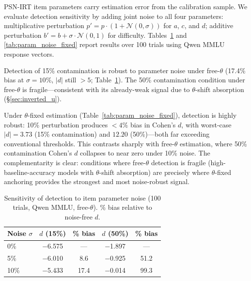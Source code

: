 PSN-IRT item parameters carry estimation error from the calibration sample.
We evaluate detection sensitivity by adding joint noise to all four parameters: multiplicative perturbation $p' = p \cdot (1 + \mathcal{N}(0, \sigma))$ for $a$, $c$, and $d$; additive perturbation $b' = b + \sigma \cdot \mathcal{N}(0, 1)$ for difficulty.
Tables~\ref{tab:param_noise_free} and \ref{tab:param_noise_fixed} report results over 100 trials using Qwen MMLU response vectors.

Detection of 15\% contamination is robust to parameter noise under free-$\theta$ (17.4\% bias at $\sigma{=}10\%$, $|d|$ still ${>}5$; Table~\ref{tab:param_noise_free}).
The 50\% contamination condition under free-$\theta$ is fragile---consistent with its already-weak signal due to $\theta$-shift absorption (\S\ref{sec:inverted_u}).

Under $\theta$-fixed estimation (Table~\ref{tab:param_noise_fixed}), detection is highly robust: 10\% perturbation produces ${<}4\%$ bias in Cohen's $d$, with worst-case $|d| = 3.73$ (15\% contamination) and $12.20$ (50\%)---both far exceeding conventional thresholds.
This contrasts sharply with free-$\theta$ estimation, where 50\% contamination Cohen's $d$ collapses to near zero under 10\% noise.
The complementarity is clear: conditions where free-$\theta$ detection is fragile (high-baseline-accuracy models with $\theta$-shift absorption) are precisely where $\theta$-fixed anchoring provides the strongest and most noise-robust signal.

\begin{table}[t]
\centering
\caption{Sensitivity of detection to item parameter noise (100 trials, Qwen MMLU, free-$\theta$). \% bias relative to noise-free $d$.}
\label{tab:param_noise_free}
\footnotesize
\begin{tabular}{@{}lcccc@{}}
\toprule
Noise $\sigma$ & $d$ (15\%) & \% bias & $d$ (50\%) & \% bias \\
\midrule
0\% & $-$6.575 & --- & $-$1.897 & --- \\
5\% & $-$6.010 & 8.6 & $-$0.925 & 51.2 \\
10\% & $-$5.433 & 17.4 & $-$0.014 & 99.3 \\
\bottomrule
\end{tabular}
\end{table}

\begin{table}[t]
\centering
\caption{Sensitivity of detection to item parameter noise (100 trials, Qwen MMLU, $\theta$-fixed). Worst-case $|d|$ over 100 trials in parentheses.}
\label{tab:param_noise_fixed}
\footnotesize
{}
\end{table}

